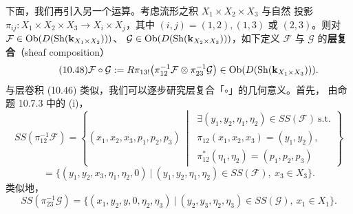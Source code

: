 下面，我们再引入另一个运算。考虑流形之积 $X_1\times X_2\times X_3$ 与自然
投影 $\pi_{ij}\colon X_1\times X_2\times X_3\to X_i\times X_j$，其中
$(i,j)=(1,2),(1,3)$ 或 $(2,3)$。则对
$\mathcal F\in\operatorname{Ob}(D(\operatorname{Sh}(\mathbf{k}_{X_1\times X_2})))$、
$\mathcal G\in\operatorname{Ob}(D(\operatorname{Sh}(\mathbf{k}_{X_2\times X_3})))$，如下定义
$\mathcal F$ 与 $\mathcal G$ 的\textbf{层复合}（sheaf composition）
\begin{equation}\tag{10.48}
  \mathcal F\circ\mathcal G
  :=R\pi_{13!}\bigl(\pi_{12}^{-1}\mathcal F
  \otimes\pi_{23}^{-1}\mathcal G\bigr)
  \in\operatorname{Ob}(D(\operatorname{Sh}(\mathbf{k}_{X_1\times X_3}))).
\end{equation}
与层卷积 (10.46) 类似，我们可以逐步研究层复合「$\circ$」的几何意义。首先，
由命题 10.7.3 中的 (i)，
\[
  SS(\pi_{12}^{-1}\mathcal F)=\left\{(x_1,x_2,x_3,p_1,p_2,p_3)\ \middle|\
  \begin{array}{l}
    \exists(y_1,y_2,\eta_1,\eta_2)\in SS(\mathcal F)\ \text{s.t.}\\
    \pi_{12}(x_1,x_2,x_3)=(y_1,y_2),\\
    \pi_{12}^*(\eta_1,\eta_2)=(p_1,p_2,p_3)
  \end{array}\right\}
\]
\[
  =\bigl\{(y_1,y_2,x_3,\eta_1,\eta_2,0)\ \big|\
  (y_1,y_2,\eta_1,\eta_2)\in SS(\mathcal F),\ x_3\in X_3\bigr\}.
\]
类似地，
\[
  SS(\pi_{23}^{-1}\mathcal G)
  =\bigl\{(x_1,y_2,y,0,\eta_2,\eta_3)\ \big|\
  (y_2,y_3,\eta_2,\eta_3)\in SS(\mathcal G),\ x_1\in X_1\bigr\}.
\]


